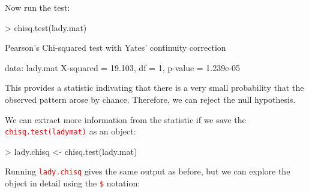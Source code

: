\documentclass[a4paper,12pt]{article}
\newcommand\code[1]{\textcolor{red}{\texttt{#1}}}
\begin{document}
Now run the test:

\begin{shaded}
\begin{Schunk}
\begin{Sinput}
> chisq.test(lady.mat)
\end{Sinput}
\begin{Soutput}
	Pearson's Chi-squared test with Yates' continuity correction

data:  lady.mat
X-squared = 19.103, df = 1, p-value = 1.239e-05
\end{Soutput}
\end{Schunk}
\end{shaded}


This provides a statistic indivating that there is a very small probability that the observed pattern arose by chance. Therefore, we can reject the null hypothesis.

We can extract more information from the statistic if we save the \code{chisq.test(ladymat)} as an object:

\begin{shaded}
\begin{Schunk}
\begin{Sinput}
> lady.chisq <- chisq.test(lady.mat)
\end{Sinput}
\end{Schunk}
\end{shaded}

Running \code{lady.chisq} gives the same output as before, but we can explore the object in detail using the \code{\$} notation:
\end{document}

